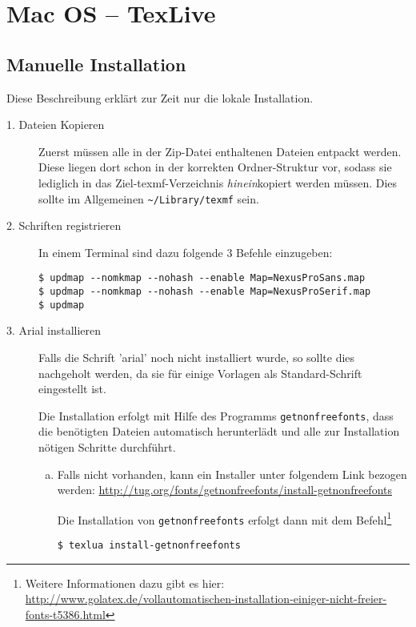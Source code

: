 \clearpage
\section{Mac OS -- TexLive}%

\subsection{Manuelle Installation}

Diese Beschreibung erklärt zur Zeit nur die lokale Installation.

\begin{description}
  \item[1. Dateien Kopieren] Zuerst müssen alle in der Zip-Datei enthaltenen
    Dateien entpackt werden.
    Diese liegen dort schon in der korrekten Ordner-Struktur vor, sodass
    sie lediglich in das Ziel-texmf-Verzeichnis \emph{hinein}kopiert werden
    müssen.
    Dies sollte im Allgemeinen \lstinline{~/Library/texmf} sein.

  \item[2. Schriften registrieren]
    In einem Terminal sind dazu folgende 3 Befehle einzugeben:
    \begin{lstlisting}[style=cmd]
$ updmap --nomkmap --nohash --enable Map=NexusProSans.map
$ updmap --nomkmap --nohash --enable Map=NexusProSerif.map
$ updmap
    \end{lstlisting}


  \item[3. Arial installieren]
    Falls die Schrift 'arial' noch nicht installiert wurde, so sollte dies
    nachgeholt werden, da sie für einige Vorlagen als Standard-Schrift
    eingestellt ist.
    
    Die Installation erfolgt mit Hilfe des Programms \lstinline{getnonfreefonts},
    dass die benötigten Dateien automatisch herunterlädt und alle zur Installation
    nötigen Schritte durchführt.
    \begin{enumerate}[a)]
      \item Falls nicht vorhanden, kann ein Installer unter folgendem Link
        bezogen werden:
        \url{http://tug.org/fonts/getnonfreefonts/install-getnonfreefonts}
    
        Die Installation von \lstinline{getnonfreefonts} erfolgt dann mit dem
        Befehl\footnote{Weitere Informationen dazu gibt es hier:\\
          \url{http://www.golatex.de/vollautomatischen-installation-einiger-nicht-freier-fonts-t5386.html}}
        \begin{lstlisting}[style=cmd]
$ texlua install-getnonfreefonts
        \end{lstlisting}
        

\end{enumerate}
\end{description}
